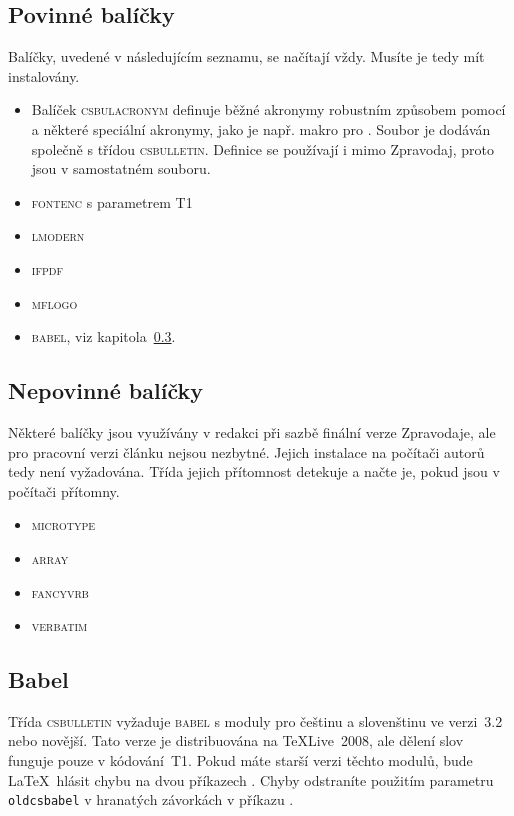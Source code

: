 \documentclass{csbulletin}
\let\pkg\textsc
\begin{document}
\subsection{Povinné balíčky}
Balíčky, uvedené v následujícím seznamu, se načítají vždy. Musíte je tedy mít instalovány.

\begin{itemize}
\item Balíček \pkg{csbulacronym} definuje běžné akronymy robustním způsobem pomocí  a
některé speciální akronymy, jako je např. makro  pro \cstug. Soubor je dodáván společně s
třídou \pkg{csbulletin}. Definice se používají i mimo Zpravodaj, proto jsou v samostatném souboru.

\item \pkg{fontenc} s parametrem T1

\item \pkg{lmodern}

\item \pkg{ifpdf}

\item \pkg{mflogo}

\item \pkg{babel}, viz kapitola~\ref{babel}.
\end{itemize}

\subsection{Nepovinné balíčky}
Některé balíčky jsou využívány v redakci při sazbě finální verze Zpravodaje, ale pro pracovní verzi
článku nejsou nezbytné. Jejich instalace na počítači autorů tedy není vyžadována. Třída jejich
přítomnost detekuje a načte je, pokud jsou v počítači přítomny.

\begin{itemize}
\item \pkg{microtype}

\item \pkg{array}

\item \pkg{fancyvrb}

\item \pkg{verbatim}
\end{itemize}

\subsection{Babel}\label{babel}
Třída \pkg{csbulletin} vyžaduje \pkg{babel} s moduly pro češtinu a slovenštinu ve verzi~3.2 nebo
novější. Tato verze je distribuována na \TeX Live~2008, ale dělení slov funguje pouze v
kódování~T1. Pokud máte starší verzi těchto modulů, bude \LaTeX\ hlásit chybu na dvou příkazech
. Chyby odstraníte použitím parametru \texttt{oldcsbabel} v hranatých
závorkách v příkazu .
\end{document}
